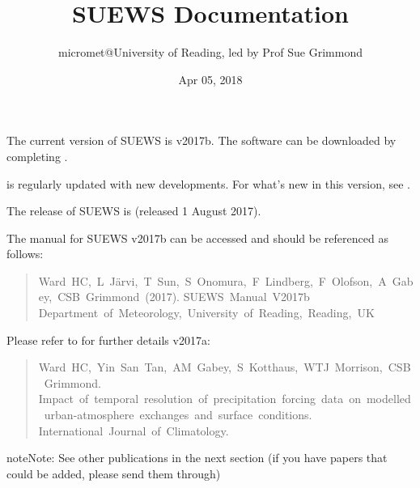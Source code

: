 \documentclass[letterpaper,10pt,english]{sphinxmanual}
\title{SUEWS Documentation}
\date{Apr 05, 2018}
\author{micromet@University of Reading, led by Prof Sue Grimmond}
\begin{document}
\maketitle
\sphinxtableofcontents
{}\label{\detokenize{index::doc}}


The current version of SUEWS is v2017b. The software can be downloaded
by completing .

{\hyperref[\detokenize{index:index-page}]{}} is regularly
updated with new developments. For what’s new in this version, see {\hyperref[\detokenize{version-history:new-latest}]{}}.

The  release of SUEWS is  (released 1 August
2017).

The manual for SUEWS v2017b can be accessed
 and should be referenced as
follows:
\begin{quote}

Ward HC, L Järvi, T Sun, S Onomura, F Lindberg, F Olofson, A Gabey, CSB Grimmond (2017).
SUEWS Manual V2017b Department of Meteorology, University of Reading, Reading, UK
\end{quote}

Please refer to  for
further details v2017a:
\begin{quote}

Ward HC, Yin San Tan, AM Gabey, S Kotthaus, WTJ Morrison, CSB Grimmond.
Impact of temporal resolution of precipitation forcing data on modelled urban-atmosphere exchanges and surface conditions.
International Journal of Climatology.
\end{quote}

\begin{sphinxadmonition}{note}{Note:}
See other publications in the next section (if you have papers that could be added, please send them through)
\end{sphinxadmonition}
\end{document}
